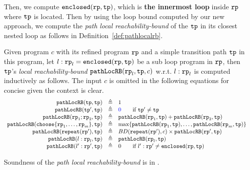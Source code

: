 Then, we compute $\mathtt{enclosed}(\mathtt{rp}, \mathtt{tp})$, which is \textbf{the innermost loop} inside $\mathtt{rp}$ where $\mathtt{tp}$ is located. Then by using the loop bound computed by our new approach, we compute the \emph{path local reachability-bound} of
the $\mathtt{tp}$ in its closest nested loop as follows in Definition~\ref{def:pathlocalrb}.
\begin{defn}
    \label{def:pathlocalrb}
    Given program $c$ with its refined program $\mathtt{rp}$ and a simple transition path $\mathtt{tp}$ in this program, 
    let $l: \mathtt{rp}_l = \mathtt{enclosed}(\mathtt{rp}, \mathtt{tp})$ be a sub loop program in $\mathtt{rp}$,
    then $\mathtt{tp}$'s \emph{local reachability-bound} $\mathtt{pathLocRB}(\mathtt{rp}_l, \mathtt{tp}, c)$ w.r.t. $l: \mathtt{rp}_l$
    is computed inductively as follows.
    The input $c$ is omitted in the following equations for concise given the context is clear.
    {\small
    \[
    \begin{array}{rcl}
      \outinB(\tpath, \tpath) & \triangleq & 1 \\
      \outinB(\tpath', \tpath) & \triangleq & \highlight{0} \qquad \text{if } \tpath' \neq \tpath\\
      \outinB(\rprog_1;\rprog_2, \tpath) & \triangleq & \outinB(\rprog_1, \tpath) + \outinB(\rprog_2, \tpath) \\
      \outinB(\rpchoose{\rprog_1, \ldots, \rprog_m }, \tpath) & \triangleq 
      & \max\left\{ \outinB(\rprog_1, \tpath), \ldots, \outinB(\rprog_m, \tpath) \right\} \\
      \outinB(\rprepeat(\rprog'), \tpath) & \triangleq 
      & BD(\rprepeat(\rprog'), c) \times \outinB(\rprog', \tpath)
       \\
       \outinB(l: \rprog_l, \tpath) & \triangleq & \outinB(\rprog_l, \tpath) \\
       \outinB(l': \rprog', \tpath) & \triangleq & 0  \qquad \text{if } l': \rprog' \neq \kw{enclosed}(\rprog, \tpath)
    \end{array}
    \]
    }
  \end{defn}
Soundness of the \emph{path local reachability-bound} is in .

